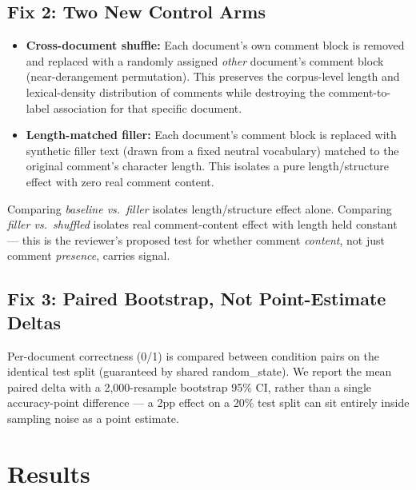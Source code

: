 \documentclass[11pt,a4paper]{article}
\begin{document}
\subsection{Fix 2: Two New Control Arms}

\begin{itemize}
    \item \textbf{Cross-document shuffle:} Each document's own comment block is removed and replaced with a randomly assigned \emph{other} document's comment block (near-derangement permutation). This preserves the corpus-level length and lexical-density distribution of comments while destroying the comment-to-label association for that specific document.
    \item \textbf{Length-matched filler:} Each document's comment block is replaced with synthetic filler text (drawn from a fixed neutral vocabulary) matched to the original comment's character length. This isolates a pure length/structure effect with zero real comment content.
\end{itemize}

Comparing \emph{baseline vs.\ filler} isolates length/structure effect alone. Comparing \emph{filler vs.\ shuffled} isolates real comment-content effect with length held constant — this is the reviewer's proposed test for whether comment \emph{content}, not just comment \emph{presence}, carries signal.

\subsection{Fix 3: Paired Bootstrap, Not Point-Estimate Deltas}

Per-document correctness (0/1) is compared between condition pairs on the identical test split (guaranteed by shared random\_state). We report the mean paired delta with a 2,000-resample bootstrap 95\% CI, rather than a single accuracy-point difference — a 2pp effect on a 20\% test split can sit entirely inside sampling noise as a point estimate.

\section{Results}
\end{document}
